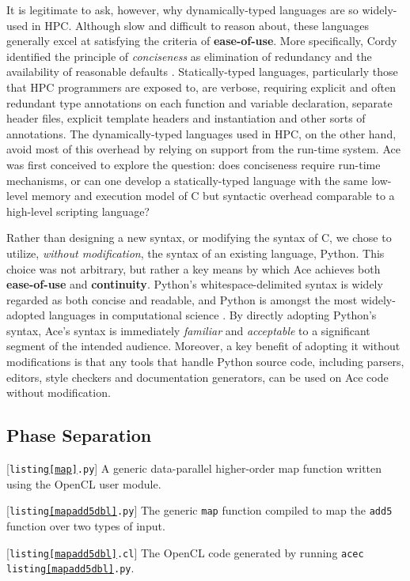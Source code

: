 \documentclass{sig-alternate}
\begin{document}
It is legitimate to ask, however, why dynamically-typed languages are so widely-used in HPC. Although slow and difficult to reason about, these languages generally excel at satisfying the criteria of \textbf{ease-of-use}. More specifically, Cordy identified the principle of \emph{conciseness} as elimination of
redundancy and the availability of reasonable defaults \cite{cordy1992hints}. Statically-typed languages, particularly those that HPC programmers are exposed to, are verbose, requiring explicit and often redundant type annotations on each function and variable declaration, separate header files, explicit template headers and  instantiation and other sorts of annotations.  The dynamically-typed languages used in HPC, on the other hand, avoid most of this overhead by relying on support from the run-time system. Ace was first conceived to explore the question: does conciseness require run-time mechanisms, or can one develop a statically-typed language with the same low-level memory and execution model of C but syntactic overhead comparable to a high-level scripting language? 

Rather than designing a new syntax, or modifying the syntax of C, we chose to utilize, \emph{without modification}, the syntax of an existing language, Python. This choice was not arbitrary, but rather a key means by which Ace achieves both \textbf{ease-of-use} and \textbf{continuity}. Python's whitespace-delimited syntax is widely regarded as both concise and readable, and Python is amongst the most widely-adopted languages in computational science \cite{pythonhpc}. By directly adopting Python's syntax, Ace's syntax is immediately \emph{familiar} and \emph{acceptable} to a significant segment of the intended audience. Moreover, a key benefit of adopting it without modifications is that any {tools} that handle Python source code, including parsers, editors, style checkers and documentation generators, can be used on Ace code without modification.

\subsection{Phase Separation}
\begin{codelisting}

\caption{[\texttt{listing\ref{map}.py}] A generic data-parallel higher-order map function written using the OpenCL user module.}
\label{map}
\end{codelisting}
\begin{codelisting}

\caption{[\texttt{listing\ref{mapadd5dbl}.py}] The generic \texttt{map} function compiled to map the \texttt{add5} function over two  types of input.}
\label{mapadd5dbl}
\end{codelisting}
\begin{codelisting}

\caption{[\texttt{listing\ref{mapadd5dbl}.cl}] The OpenCL code generated by running \texttt{acec listing\ref{mapadd5dbl}.py}.}
\label{mapout}
\end{codelisting}
\end{document}
